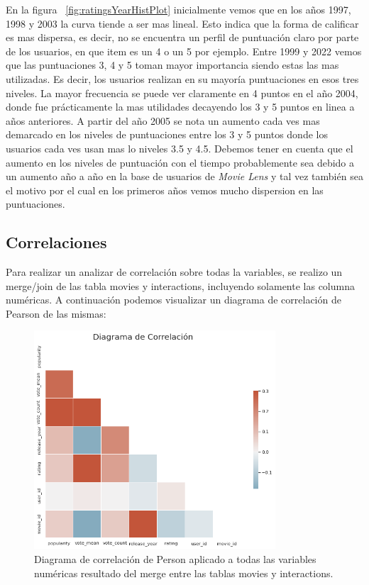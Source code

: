 \documentclass[11pt,a4paper,twoside]{thesis}
\begin{document}
En la figura ~\ref{fig:ratingsYearHistPlot} inicialmente vemos que en los años
1997, 1998 y 2003 la curva tiende a ser mas lineal. Esto indica que la forma de
calificar es mas dispersa, es decir, no se encuentra un perfil de puntuación
claro por parte de los usuarios, en que item es un 4 o un 5 por ejemplo. Entre
1999 y 2022 vemos que las puntuaciones 3, 4 y 5 toman mayor importancia siendo
estas las mas utilizadas. Es decir, los usuarios realizan en su mayoría
puntuaciones en esos tres niveles. La mayor frecuencia se puede ver claramente
en 4 puntos en el año 2004, donde fue prácticamente la mas utilidades decayendo
los 3 y 5 puntos en linea a años anteriores. A partir del año 2005 se nota un
aumento cada ves mas demarcado en los niveles de puntuaciones entre los 3 y 5
puntos donde los usuarios cada ves usan mas lo niveles 3.5 y 4.5. Debemos tener
en cuenta que el aumento en los niveles de puntuación con el tiempo
probablemente sea debido a un aumento año a año en la base de usuarios de
\textit{Movie Lens} y tal vez también sea el motivo por el cual en los primeros
años vemos mucho dispersion en las puntuaciones.

\clearpage

\subsection{Correlaciones}

Para realizar un analizar de correlación sobre todas la variables, se realizo
un merge/join de las tabla movies y interactions, incluyendo solamente las
columna numéricas. A continuación podemos visualizar un diagrama de correlación
de Pearson de las mismas:

\begin{figure}[h!]
	\centering
	\includegraphics[width=9cm]{./images/Correlations.png}
	\caption{Diagrama de correlación de Person aplicado a todas las variables numéricas resultado del merge entre las tablas movies y interactions.}
	\label{fig:correlationPlot}
\end{figure}
\end{document}
